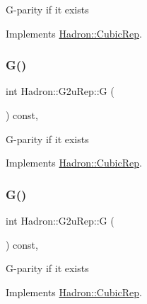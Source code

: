 G-\/parity if it exists 

Implements \mbox{\hyperlink{structHadron_1_1CubicRep_a52104e43266d1614c00bbd1c3b395458}{Hadron\+::\+Cubic\+Rep}}.

\mbox{\label{structHadron_1_1G2uRep_ada683c14614d17ba8a131f1b32a1777d}} 
\subsubsection{\texorpdfstring{G()}{G()}\hspace{0.1cm}{\footnotesize\ttfamily [2/3]}}
{\footnotesize\ttfamily int Hadron\+::\+G2u\+Rep\+::G (\begin{DoxyParamCaption}{ }\end{DoxyParamCaption}) const\hspace{0.3cm}{\ttfamily [inline]}, {\ttfamily [virtual]}}

G-\/parity if it exists 

Implements \mbox{\hyperlink{structHadron_1_1CubicRep_a52104e43266d1614c00bbd1c3b395458}{Hadron\+::\+Cubic\+Rep}}.

\mbox{\label{structHadron_1_1G2uRep_ada683c14614d17ba8a131f1b32a1777d}} 
\subsubsection{\texorpdfstring{G()}{G()}\hspace{0.1cm}{\footnotesize\ttfamily [3/3]}}
{\footnotesize\ttfamily int Hadron\+::\+G2u\+Rep\+::G (\begin{DoxyParamCaption}{ }\end{DoxyParamCaption}) const\hspace{0.3cm}{\ttfamily [inline]}, {\ttfamily [virtual]}}

G-\/parity if it exists 

Implements \mbox{\hyperlink{structHadron_1_1CubicRep_a52104e43266d1614c00bbd1c3b395458}{Hadron\+::\+Cubic\+Rep}}.

\mbox{\label{structHadron_1_1G2uRep_a6e7c7549e4d779122e5274dd0128687e}} 
